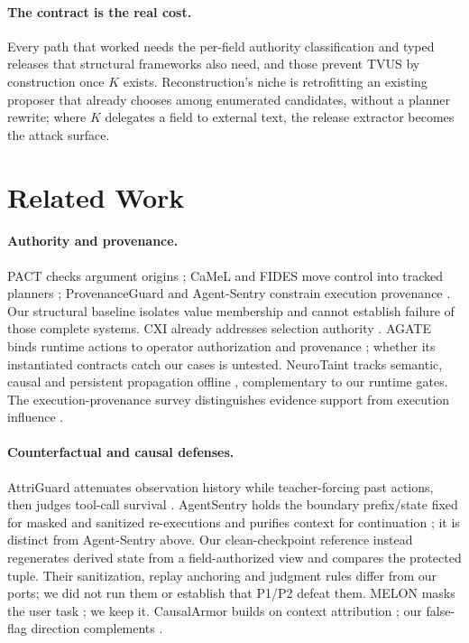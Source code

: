 \documentclass[letterpaper]{article} %
\begin{document}
\paragraph{The contract is the real cost.} Every path that worked needs the per-field authority classification and typed releases that structural frameworks also need, and those prevent TVUS by construction once $K$ exists. Reconstruction's niche is retrofitting an existing proposer that already chooses among enumerated candidates, without a planner rewrite; where $K$ delegates a field to external text, the release extractor becomes the attack surface.

\section{Related Work}
\label{sec:related}

\paragraph{Authority and provenance.}
PACT checks argument origins \citep{fan2026pact}; CaMeL and FIDES move control into tracked planners \citep{debenedetti2025camel,costa2025fides}; ProvenanceGuard and Agent-Sentry constrain execution provenance \citep{she2026provenanceguard,sequeira2026agentsentry}. Our structural baseline isolates value membership and cannot establish failure of those complete systems. CXI already addresses selection authority \citep{santosgrueiro2026cxi}. AGATE binds runtime actions to operator authorization and provenance \citep{zhang2026agate}; whether its instantiated contracts catch our cases is untested. NeuroTaint tracks semantic, causal and persistent propagation offline \citep{cai2026neurotaint}, complementary to our runtime gates. The execution-provenance survey distinguishes evidence support from execution influence \citep{wang2026traces}.

\paragraph{Counterfactual and causal defenses.}
AttriGuard attenuates observation history while teacher-forcing past actions, then judges tool-call survival \citep{he2026attriguard}. AgentSentry holds the boundary prefix/state fixed for masked and sanitized re-executions and purifies context for continuation \citep{zhang2026agentsentry}; it is distinct from Agent-Sentry above. Our clean-checkpoint reference instead regenerates derived state from a field-authorized view and compares the protected tuple. Their sanitization, replay anchoring and judgment rules differ from our ports; we did not run them or establish that P1/P2 defeat them. MELON masks the user task \citep{melon2025}; we keep it. CausalArmor \citep{kim2026causalarmor} builds on context attribution \citep{cohenwang2024contextcite,liu2025attribot}; our false-flag direction complements \citet{ahad2026influence}.
\end{document}
